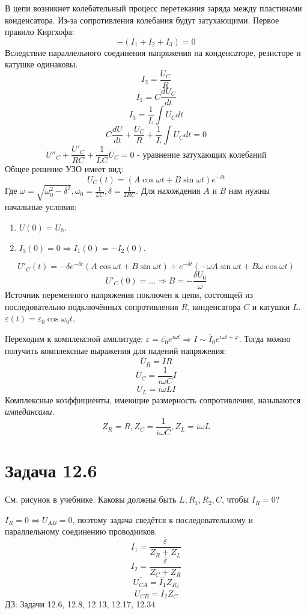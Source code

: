 \documentclass[11pt]{article}
\begin{document}
В цепи возникнет колебательный процесс перетекания заряда между пластинами конденсатора. Из-за сопротивления
колебания будут затухающими.
Первое правило Киргхофа:
$$-(I_1 + I_2 + I_3) = 0$$
Вследствие параллельного соединения напряжения на конденсаторе, резисторе и катушке одинаковы.
$$I_2 = \frac{U_C}R$$
$$I_1 = C\frac{dU_C}{dt}$$
$$I_3 = \frac{1}L\int U_Cdt$$
$$C\frac{dU}{dt} + \frac{U_C}R + \frac{1}L\int U_Cdt = 0$$
$$U''_C + \frac{U'_C}{RC} + \frac{1}{LC}U_C = 0 \text{ - уравнение затухающих колебаний}$$
Общее решение УЗО имеет вид:
$$U_C(t) = (A\cos \omega t + B\sin \omega t)e^{-\delta t}$$
Где \(\omega = \sqrt{\omega_0^2 - \delta^2}, \omega_0 = \frac{1}{LC}, \delta = \frac{1}{2RC}\).
Для нахождения \(A\) и \(B\) нам нужны начальные условия:
\begin{enumerate}
\item \(U(0) = U_0\).
\item \(I_3(0) = 0 \Rightarrow I_1(0) = -I_2(0)\).
\end{enumerate}
$$U'_C(t) = -\delta e^{-\delta t}(A\cos\omega t + B\sin\omega t) + e^{-\delta t}(-\omega A\sin\omega t + B\omega\cos\omega t)$$
$$U'_C(0) = \ldots \Rightarrow B = -\frac{\delta U_0}\omega$$
Источник переменного напряжения поключен к цепи, состоящей из последовательно подключённых сопротивления \(R\),
конденсатора \(C\) и катушки \(L\). \(\varepsilon(t) = \varepsilon_0\cos\omega_0 t\).

Переходим к комплексной амплитуде: \(\varepsilon = \overline{\varepsilon_0}e^{i\omega t} \Rightarrow I \sim \overline I_0e^{i\omega t + \varphi}\).
Тогда можно получить комплексные выражения для падений напряжения:
$$\overline U_R = \overline IR$$
$$\overline U_C = \frac{1}{i\omega C}\overline I$$
$$\overline U_L = i\omega L\overline I$$
Комплексные коэффициенты, имеющие размерность сопротивления, называются \textit{импедансами}.
$$Z_R = R, Z_C = \frac{1}{i\omega C}, Z_L = i\omega L$$
\section{Задача 12.6}
\label{sec:org9ae228c}
См. рисунок в учебнике. Каковы должны быть \(L, R_1, R_2, C\), чтобы \(I_R = 0\)?

\(I_R = 0 \Leftrightarrow U_{AB} = 0\), поэтому задача сведётся к последовательному и параллельному соединению проводников.
$$\overline{I_1} = \frac{\overline\varepsilon}{Z_R + Z_L}$$
$$\overline{I_2} = \frac{\overline\varepsilon}{Z_C + Z_R}$$
$$\overline{U_{CA}} = \overline{I_1}Z_{R_2}$$
$$\overline{U_{CB}} = \overline{I_2}Z_C$$
ДЗ: Задачи 12.6, 12.8, 12.13, 12.17, 12.34
\end{document}

